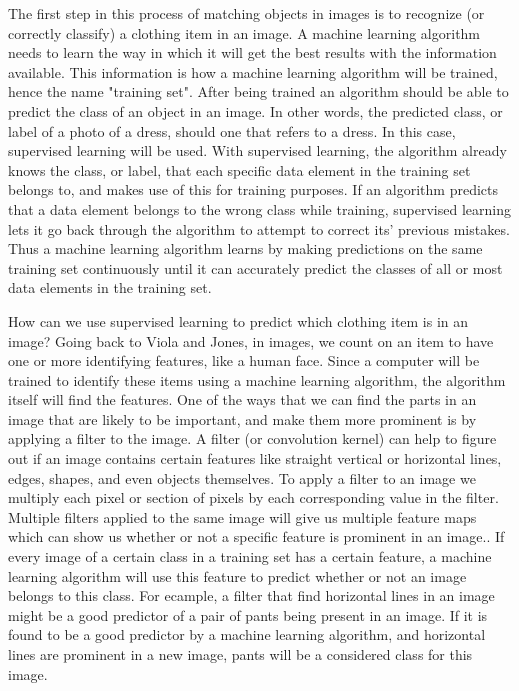 \documentclass[12pt]{article} %
\begin{document}
The first step in this process of matching objects in images is to recognize (or correctly classify) a clothing item in an image. A machine learning algorithm needs to learn the way in which it will get the best results with the information available. This information is how a machine learning algorithm will be trained, hence the name "training set". After being trained an algorithm should be able to predict the class of an object in an image. In other words, the predicted class, or label of a photo of a dress, should one that refers to a dress. In this case, supervised learning will be used. With supervised learning, the algorithm already knows the class, or label, that each specific data element in the training set belongs to, and makes use of this for training purposes. If an algorithm predicts that a data element belongs to the wrong class while training, supervised learning lets it go back through the algorithm to attempt to correct its' previous mistakes\cite{aurelienMachineLearning}. Thus a machine learning algorithm learns by making predictions on the same training set continuously until it can accurately predict the classes of all or most data elements in the training set.

How can we use supervised learning to predict which clothing item is in an image? Going back to Viola and Jones, in images, we count on an item to have one or more identifying features, like a human face. Since a computer will be trained to identify these items using a machine learning algorithm, the algorithm itself will find the features. One of the ways that we can find the parts in an image that are likely to be important, and make them more prominent is by applying a filter to the image. A filter (or convolution kernel) can help to figure out if an image contains certain features like straight vertical or horizontal lines, edges, shapes, and even objects themselves. To apply a filter to an image we multiply each pixel or section of pixels by each corresponding value in the filter. Multiple filters applied to the same image will give us multiple feature maps which can show us whether or not a specific feature is prominent in an image.\cite{aurelienMachineLearning}. If every image of a certain class in a training set has a certain feature, a machine learning algorithm will use this feature to predict whether or not an image belongs to this class. For ecample, a filter that find horizontal lines in an image might be a good predictor of a pair of pants being present in an image. If it is found to be a good predictor by a machine learning algorithm, and horizontal lines are prominent in a new image, pants will be a considered class for this image. 
\end{document}
